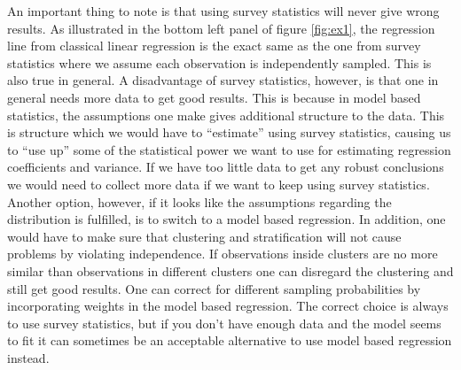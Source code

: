 \documentclass{article}
\begin{document}
An important thing to note is that using survey statistics will never give wrong
results. As illustrated in the bottom left panel of figure \ref{fig:ex1}, the
regression line from classical linear regression is the exact same as the one
from survey statistics where we assume each observation is independently sampled.
This is also true in general. A disadvantage of survey statistics, however, is
that one in general needs more data to get good results. This is because in
model based statistics, the assumptions one make gives additional structure to
the data. This is structure which we would have to ``estimate'' using survey
statistics, causing us to ``use up'' some of the statistical power we want to
use for estimating regression coefficients and variance. If we have too little
data to get any robust conclusions we would need to collect more data if we want
to keep using survey statistics. Another option, however, if it looks like the
assumptions regarding the distribution is  fulfilled, is to switch to
a model based regression. In addition, one would have to make sure that
clustering and stratification will not cause problems by violating independence.
If observations inside clusters are no more similar than observations in
different clusters one can disregard the clustering and still get good results.
One can correct for different sampling probabilities by incorporating weights in
the model based regression.
The correct choice is always to use survey statistics, but if you don't have
enough data and the model seems to fit it can sometimes be an acceptable
alternative to use model based regression instead.


%
%
%
%
%
%
%
%
%
%

\medskip


\end{document}
